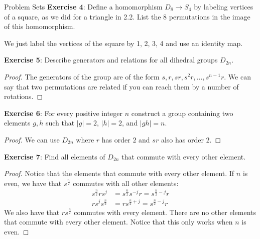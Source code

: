 \documentclass{report}
\begin{document}
\begin{exercises}{Problem Sets}
    \textbf{Exercise 4}: Define a homomorphism $D_{8} \rightarrow S_{4}$ by labeling vertices of a square, as we did for a triangle in 2.2. List the 8 permutations in the image of this homomorphism.
        \begin{answer}
            We just label the vertices of the square by 1, 2, 3, 4 and use an identity map.
        \end{answer}

    \textbf{Exercise 5}: Describe generators and relations for all dihedral groups $D_{2n}$. 
        \begin{proof}
            The generators of the group are of the form $s, r, sr, s^{2}r, \ldots, s^{n - 1}r$. We can say that two permutations are related if you can reach them by a number of rotations.
        \end{proof}

    \textbf{Exercise 6}: For every positive integer $n$ construct a group containing two elements $g, h$ such that $\lvert g \rvert = 2$, $\lvert h \rvert = 2$, and $\lvert gh \rvert = n$.
        \begin{proof}
            We can use $D_{2n}$ where $r$ has order $2$ and $sr$ also has order $2$.
        \end{proof}

    \textbf{Exercise 7}: Find all elements of $D_{2n}$ that commute with every other element.
        \begin{proof}
            Notice that the elements that commute with every other element. If $n$ is even, we have that $s^{\frac{n}{2}}$ commutes with all other elements:
                \begin{align*}
                    s^{\frac{n}{2}}rs^{j} &= s^{\frac{n}{2}}s^{-j}r = s^{\frac{n}{2} - j}r \\
                    rs^{j}s^{\frac{n}{2}} &= rs^{\frac{n}{2} + j} = s^{\frac{n}{2} - j}r     
                \end{align*}
            We also have that $rs^{\frac{n}{2}}$ commutes with every element. There are no other elements that commute with every other element. Notice that this only works when $n$ is even.
        \end{proof}


\end{exercises}
\end{document}
